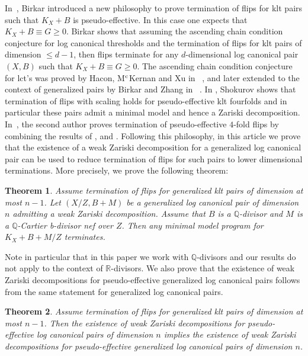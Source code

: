 \documentclass{amsart}
\renewcommand{\qq}{\mathbb{Q}}
\newcommand{\rr}{\mathbb{R}}
\newtheorem{introthm}{Theorem}
\theoremstyle{remark}
\numberwithin{equation}{section}
\begin{document}
In~\cite{Bir07}, Birkar introduced a new philosophy to prove termination of flips for klt pairs such that $K_X+B$ is pseudo-effective. In this case one expects that $K_X+B\equiv G\geq 0$.  Birkar shows  that assuming the  ascending chain condition  conjecture  for log canonical thresholds and the termination of flips for klt pairs of dimension $\leq d-1$, then flips terminate for any $d$-dimensional log canonical pair $(X,B)$ such that $K_X+B\equiv G\geq 0$.
The  ascending chain condition  conjecture for lct's was proved by Hacon, M$^{\rm c}$Kernan and Xu in ~\cite{HMX14}, and later extended to the context of generalized pairs by Birkar and Zhang in ~\cite{BZ16}. In \cite{Shok09}, Shokurov shows that termination of flips with scaling holds for pseudo-effective klt fourfolds and in particular these pairs admit a minimal model and hence a Zariski decomposition. 
In~\cite{Mor18}, the second author proves  termination of pseudo-effective $4$-fold flips by combining the results of \cite{Bir07}, \cite{Shok09} and \cite{BZ16}.
Following this philosophy, in this article we prove that the existence of a weak Zariski decomposition for a generalized log canonical pair 
can be used to reduce termination of flips for such pairs to lower dimensional terminations. More precisely, we prove the following theorem:

\begin{introthm}\label{termination}
Assume termination of flips for generalized klt pairs of dimension at most $ n-1$.
Let $(X/Z,B+M)$ be a generalized log canonical pair of dimension $n$
admitting a weak Zariski decomposition.
Assume that $B$ is a $\qq$-divisor and $M$ is a $\qq$-Cartier b-divisor nef over $Z$.
Then any minimal model program for $K_X+B+M/Z$ terminates.
\end{introthm}

Note in particular that in this paper we work with $\qq$-divisors and our results do not apply to the context of $\rr$-divisors.
We also prove that the existence of weak Zariski decompositions for pseudo-effective generalized log canonical pairs follows from the same statement for generalized log canonical pairs.

\begin{introthm}\label{genwzd}
Assume termination of flips for generalized klt pairs of dimension at most $n-1$.
Then the existence of weak Zariski decompositions for pseudo-effective log canonical pairs of dimension $n$
implies the existence of weak Zariski decompositions for pseudo-effective generalized log canonical pairs of dimension $n$.
\end{introthm}
\end{document}
